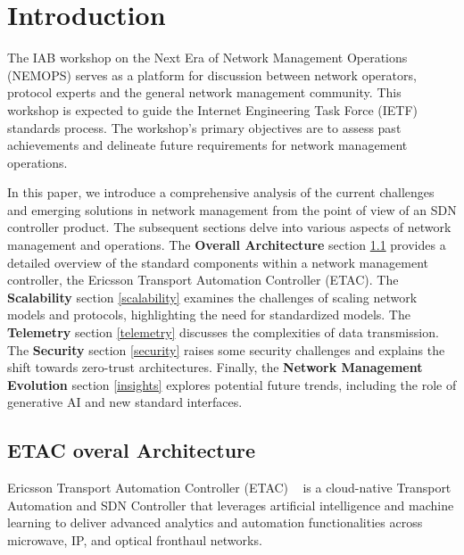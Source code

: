 \documentclass[10pt,sigconf]{iabart}
\begin{document}

\maketitle

\section{Introduction} \label{introduction}

The IAB workshop on the Next Era of Network Management Operations (NEMOPS) serves as a platform for discussion between network operators, protocol experts and the general network management community. This workshop is expected to guide the Internet Engineering Task Force (IETF) standards process. The workshop's primary objectives are to assess past achievements and delineate future requirements for network management operations.

In this paper, we introduce a comprehensive analysis of the current challenges and emerging solutions in network management from the point of view of an SDN controller product. The subsequent sections delve into various aspects of network management and operations. The \textbf{Overall Architecture} section \ref{overview} provides a detailed overview of the standard components within a network management controller, the Ericsson Transport Automation Controller (ETAC). The \textbf{Scalability} section \ref{scalability} examines the challenges of scaling network models and protocols, highlighting the need for standardized models. The \textbf{Telemetry} section \ref{telemetry} discusses the complexities of data transmission. The \textbf{Security} section \ref{security} raises some security challenges and explains the shift towards zero-trust architectures. Finally, the \textbf{Network Management Evolution} section \ref{insights} explores potential future trends, including the role of generative AI and new standard interfaces.

\subsection{ETAC overal Architecture} \label{overview}

Ericsson Transport Automation Controller (ETAC) ~\cite{ericsson-etac} is a cloud-native Transport Automation and SDN Controller that leverages artificial intelligence and machine learning to deliver advanced analytics and automation functionalities across microwave, IP, and optical fronthaul networks.
\end{document}
